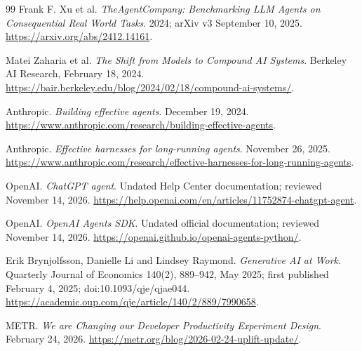 \documentclass[11pt,letterpaper]{article}
\begin{document}
\begin{thebibliography}{99}
Frank F. Xu et al. \emph{TheAgentCompany: Benchmarking LLM Agents on Consequential Real World Tasks}.
2024; arXiv v3 September 10, 2025.
\url{https://arxiv.org/abs/2412.14161}.

Matei Zaharia et al. \emph{The Shift from Models to Compound AI Systems}.
Berkeley AI Research, February 18, 2024.
\url{https://bair.berkeley.edu/blog/2024/02/18/compound-ai-systems/}.

Anthropic. \emph{Building effective agents}.
December 19, 2024.
\url{https://www.anthropic.com/research/building-effective-agents}.

Anthropic. \emph{Effective harnesses for long-running agents}.
November 26, 2025.
\url{https://www.anthropic.com/research/effective-harnesses-for-long-running-agents}.

OpenAI. \emph{ChatGPT agent}.
Undated Help Center documentation; reviewed November 14, 2026.
\url{https://help.openai.com/en/articles/11752874-chatgpt-agent}.

OpenAI. \emph{OpenAI Agents SDK}.
Undated official documentation; reviewed November 14, 2026.
\url{https://openai.github.io/openai-agents-python/}.

Erik Brynjolfsson, Danielle Li and Lindsey Raymond. \emph{Generative AI at Work}.
Quarterly Journal of Economics 140(2), 889--942, May 2025; first published February 4, 2025; doi:10.1093/qje/qjae044.
\url{https://academic.oup.com/qje/article/140/2/889/7990658}.

METR. \emph{We are Changing our Developer Productivity Experiment Design}.
February 24, 2026.
\url{https://metr.org/blog/2026-02-24-uplift-update/}.
\end{thebibliography}
\end{document}
